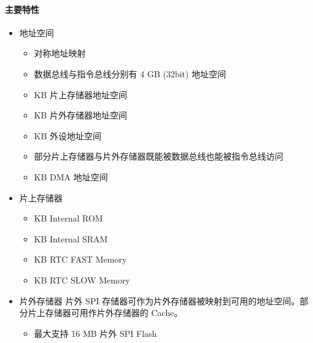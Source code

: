 \documentclass[a4paper,12pt,english]{sphinxmanual}
\begin{document}
\paragraph{主要特性}
\label{\detokenize{dev-board/esp32:id8}}\begin{itemize}
\item {} 
\sphinxAtStartPar
地址空间
\begin{itemize}
\item {} 
\sphinxAtStartPar
对称地址映射

\item {} 
\sphinxAtStartPar
数据总线与指令总线分别有 4 GB (32\sphinxhyphen{}bit) 地址空间

\item {} 
 KB 片上存储器地址空间

\item {} 
 KB 片外存储器地址空间

\item {} 
 KB 外设地址空间

\item {} 
\sphinxAtStartPar
部分片上存储器与片外存储器既能被数据总线也能被指令总线访问

\item {} 
 KB DMA 地址空间

\end{itemize}

\item {} 
\sphinxAtStartPar
片上存储器
\begin{itemize}
\item {} 
 KB Internal ROM

\item {} 
 KB Internal SRAM

\item {} 
 KB RTC FAST Memory

\item {} 
 KB RTC SLOW Memory

\end{itemize}

\item {} 
\sphinxAtStartPar
片外存储器 片外 SPI 存储器可作为片外存储器被映射到可用的地址空间。部分片上存储器可用作片外存储器的 Cache。
\begin{itemize}
\item {} 
\sphinxAtStartPar
最大支持 16 MB 片外 SPI Flash


\end{itemize}
\end{itemize}
\end{document}
